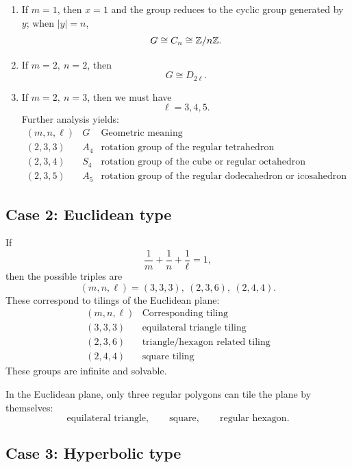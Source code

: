 \begin{enumerate}
\item If \(m=1\), then \(x=1\) and the group reduces to the cyclic group generated by \(y\); when \(|y|=n\),
\[
G\cong C_n\cong \mathbb{Z}/n\mathbb{Z}.
\]

\item If \(m=2,\ n=2\), then
\[
G\cong D_{2\ell}.
\]

\item If \(m=2,\ n=3\), then we must have
\[
\ell=3,4,5.
\]
Further analysis yields:
\[
\begin{array}{c|c|c}
(m,n,\ell) & G & \text{Geometric meaning}\\ \hline
(2,3,3) & A_4 & \text{rotation group of the regular tetrahedron}\\
(2,3,4) & S_4 & \text{rotation group of the cube or regular octahedron}\\
(2,3,5) & A_5 & \text{rotation group of the regular dodecahedron or icosahedron}
\end{array}
\]
\end{enumerate}

\subsection*{Case 2: Euclidean type}

If
\[
\frac1m+\frac1n+\frac1\ell=1,
\]
then the possible triples are
\[
(m,n,\ell)=(3,3,3),\ (2,3,6),\ (2,4,4).
\]
These correspond to tilings of the Euclidean plane:
\[
\begin{array}{c|c}
(m,n,\ell) & \text{Corresponding tiling}\\ \hline
(3,3,3) & \text{equilateral triangle tiling}\\
(2,3,6) & \text{triangle/hexagon related tiling}\\
(2,4,4) & \text{square tiling}
\end{array}
\]
These groups are infinite and solvable.

\begin{remark}
In the Euclidean plane, only three regular polygons can tile the plane by themselves:
\[
\text{equilateral triangle},\qquad \text{square},\qquad \text{regular hexagon}.
\]
\end{remark}

\subsection*{Case 3: Hyperbolic type}

